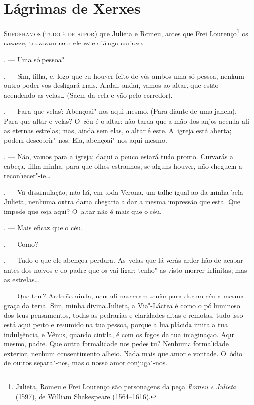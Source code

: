 \chapter{Lágrimas de Xerxes}

\begin{linenumbers}

\textsc{Suponhamos (tudo é de supor)} que Julieta e Romeu, antes que Frei
Lourenço\footnote{Julieta, Romeu e Frei Lourenço são personagens da peça
  \emph{Romeu e Julieta} (1597), de William Shakespeare (1564--1616).} os
casasse, travavam com ele este diálogo curioso:

\begin{Parskip}
. --- Uma só pessoa?

. --- Sim, filha, e, logo que eu houver feito de vós ambos
uma só pessoa, nenhum outro poder vos desligará mais. Andai, andai,
vamos ao altar, que estão acendendo as velas\ldots{} (Saem da cela e vão pelo
corredor).

. --- Para que velas? Abençoai"-nos aqui mesmo. (Para diante de uma
janela). Para que altar e velas? O~céu é o altar: não tarda que a mão
dos anjos acenda ali as eternas estrelas; mas, ainda sem elas, o altar é
este. A~igreja está aberta; podem descobrir"-nos. Eia, abençoai"-nos aqui
mesmo.

. --- Não, vamos para a igreja; daqui a pouco estará tudo
pronto. Curvarás a cabeça, filha minha, para que olhos estranhos, se
alguns houver, não cheguem a reconhecer"-te\ldots{}

. --- Vã dissimulação; não há, em toda Verona, um talhe igual ao da
minha bela Julieta, nenhuma outra dama chegaria a dar a mesma impressão
que esta. Que impede que seja aqui? O~altar não é mais que o céu.

. --- Mais eficaz que o céu.

. --- Como?

. --- Tudo o que ele abençoa perdura. As~velas que lá verás
arder hão de acabar antes dos noivos e do padre que os vai ligar;
tenho"-as visto morrer infinitas; mas as estrelas\ldots{}

. --- Que tem? Arderão ainda, nem ali nasceram senão para dar ao céu
a mesma graça da terra. Sim, minha divina Julieta, a Via"-Láctea é como o
pó luminoso dos teus pensamentos, todas as pedrarias e claridades altas
e remotas, tudo isso está aqui perto e resumido na tua pessoa, porque a
lua plácida imita a tua indulgência, e Vênus, quando cintila, é com os
fogos da tua imaginação. Aqui mesmo, padre. Que outra formalidade nos
pedes tu? Nenhuma formalidade exterior, nenhum consentimento alheio.
Nada mais que amor e vontade. O~ódio de outros separa"-nos, mas o nosso
amor conjuga"-nos.


\end{Parskip}
\end{linenumbers}
